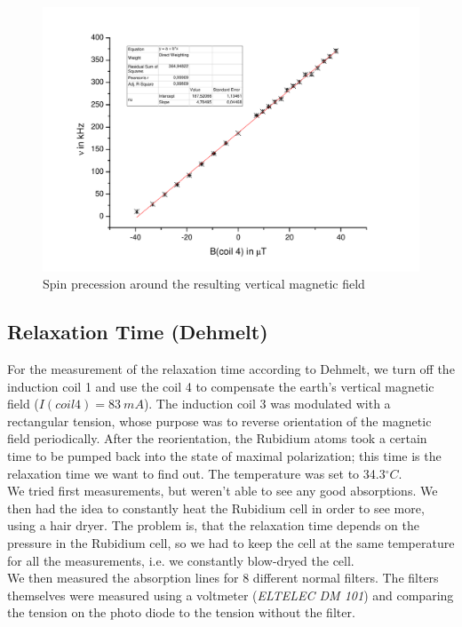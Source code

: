 \begin{figure}[H]
\centering \includegraphics[width=1.1\textwidth]{BilderAusw/praezfeld.pdf}
\caption{Spin precession around the resulting vertical magnetic field}
\end{figure}


\subsection{Relaxation Time (Dehmelt)}

For the measurement of the relaxation time according to Dehmelt, we turn off the induction coil 1 and use the coil 4 to compensate the earth's vertical magnetic field ($I(coil4) = 83\ mA$). The induction coil 3 was modulated with a rectangular tension, whose purpose was to reverse orientation of the magnetic field periodically. After the reorientation, the Rubidium atoms took a certain time to be pumped back into the state of maximal polarization; this time is the relaxation time we want to find out. The temperature was set to 34.3$^\circ C$.\\

We tried first measurements, but weren't able to see any good absorptions. We then had the idea to constantly heat the Rubidium cell in order to see more, using a hair dryer. The problem is, that the relaxation time depends on the pressure in the Rubidium cell, so we had to keep the cell at the same temperature for all the measurements, i.e. we constantly blow-dryed the cell.\\

We then measured the absorption lines for 8 different normal filters. The filters themselves were measured using a voltmeter (\emph{ELTELEC DM 101}) and comparing the tension on the photo diode to the tension without the filter.\\

